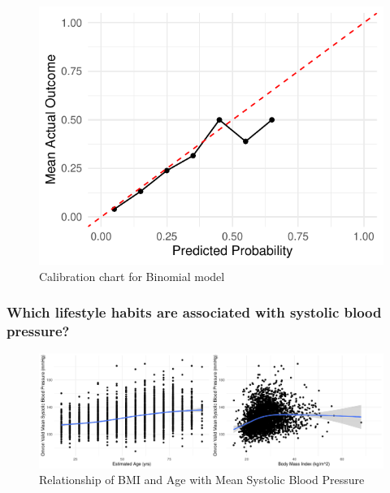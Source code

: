 \documentclass[
  11pt,
  twocolumn]{article}
\begin{document}
\begin{figure}[H]

{\centering \includegraphics{Coursework_files/figure-latex/output-calibration-chart-1} 

}

\caption{Calibration chart for Binomial model}\label{fig:output-calibration-chart}
\end{figure}

\hypertarget{which-lifestyle-habits-are-associated-with-systolic-blood-pressure}{%
\subsubsection{Which lifestyle habits are associated with systolic blood
pressure?}\label{which-lifestyle-habits-are-associated-with-systolic-blood-pressure}}

\begin{figure}[H]
\includegraphics{Coursework_files/figure-latex/output relationship plots-1} \caption{Relationship of BMI and Age with Mean Systolic Blood Pressure}\label{fig:output relationship plots}
\end{figure}
\end{document}
